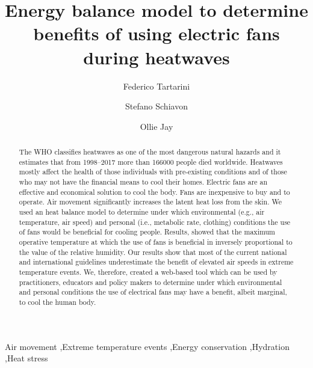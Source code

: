 
\begin{frontmatter}

\title{Energy balance model to determine benefits of using electric fans during heatwaves}

\author[sinBerBest]{Federico Tartarini}
\author[CBE]{Stefano Schiavon}
\author[USYD]{Ollie Jay}

\address[sinBerBest]{SinBerBEST, Berkeley Education Alliance for Research in Singapore, Singapore}
\address[CBE]{Center for the Built Environment, University of California, Berkeley, USA}
\address[USYD]{Sydney School ofHealth Sciences, Faculty ofMedicine and Health, The University ofSydney, Sydney, Australia}

\begin{abstract}
    The WHO classifies heatwaves as one of the most dangerous natural hazards and it estimates that from 1998--2017 more than 166000 people died worldwide.
    Heatwaves mostly affect the health of those individuals with pre-existing conditions and of those who may not have the financial means to cool their homes.
    Electric fans are an effective and economical solution to cool the body.
    Fans are inexpensive to buy and to operate.
    Air movement significantly increases the latent heat loss from the skin.
    We used an heat balance model to determine under which environmental (e.g., air temperature, air speed) and personal (i.e., metabolic rate, clothing) conditions the use of fans would be beneficial for cooling people.
    Results, showed that the maximum operative temperature at which the use of fans is beneficial in inversely proportional to the  value of the relative humidity.
    Our results show that most of the current national and international guidelines underestimate the benefit of elevated air speeds in extreme temperature events.
    We, therefore, created a web-based tool which can be used by practitioners, educators and policy makers to determine under which environmental and personal conditions the use of electrical fans may have a benefit, albeit marginal, to cool the human body.
\end{abstract}

\begin{keyword}
Air movement \sep Extreme temperature events \sep Energy conservation \sep Hydration \sep Heat stress
\end{keyword}

\end{frontmatter}
